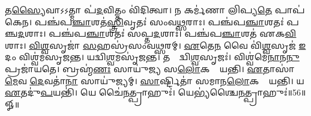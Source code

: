    𑌤\ul{𑌸𑍍𑌯𑍈}𑌵𑌾𑌽𑌽𑌤𑍍𑌮𑌾 𑌪॑\ul{𑌦}𑌵𑌿𑌤𑍍𑌤𑌂 𑌵𑌿॑𑌦𑌿𑌤𑍍𑌵𑌾।
   𑌨 𑌕𑌰𑍍𑌮॑𑌣𑌾 𑌲𑌿𑌪𑍍𑌯\ul{𑌤𑍇} 𑌪𑌾𑌪॑𑌕𑍇𑌨।
   𑌪𑌞𑍍𑌚॑𑌪\ul{𑌞𑍍𑌚𑌾}𑌶𑌤॑\ul{𑌸𑍍𑌤𑍍𑌰𑌿}𑌵𑍃𑌤𑌃॑ 𑌸𑌂𑌵\ul{𑌥𑍍𑌸}𑌰𑌾𑌃।
   𑌪𑌞𑍍𑌚॑𑌪\ul{𑌞𑍍𑌚𑌾}𑌶𑌤𑌃॑ 𑌪𑌞𑍍𑌚\ul{𑌦}𑌶𑌾𑌃।
   𑌪𑌞𑍍𑌚॑𑌪\ul{𑌞𑍍𑌚𑌾}𑌶𑌤𑌃॑ 𑌸𑌪𑍍𑌤\ul{𑌦}𑌶𑌾𑌃।
   𑌪𑌞𑍍𑌚॑𑌪\ul{𑌞𑍍𑌚𑌾}𑌶𑌤॑ 𑌏𑌕\ul{𑌵𑌿}\ul{}𑌶𑌾𑌃।
   \ul{𑌵𑌿}\ul{𑌶𑍍𑌵}𑌸𑍃𑌜𑌾॑ \ul{𑌸}𑌹𑌸𑍍𑌰॑𑌸𑌂𑌵𑌥𑍍𑌸𑌰𑌮𑍍।
   \ul{𑌏}𑌤𑍇\ul{𑌨} 𑌵𑍈 𑌵𑌿॑\ul{𑌶𑍍𑌵}𑌸𑍃𑌜॑ \ul{𑌇}𑌦𑌂 𑌵𑌿𑌶𑍍𑌵॑𑌮𑌸𑍃𑌜𑌨𑍍𑌤।
   𑌯𑌦𑍍𑌵𑌿\ul{𑌶𑍍𑌵}𑌮𑌸𑍃॑𑌜𑌨𑍍𑌤।
   𑌤𑌸𑍍𑌮𑌾᳚𑌦𑍍𑌵𑌿\ul{𑌶𑍍𑌵}𑌸𑍃𑌜𑌃॑।
   𑌵𑌿𑌶𑍍𑌵॑𑌮𑍇\ul{𑌨𑌾}𑌨\ul{𑌨𑍁} 𑌪𑍍𑌰𑌜𑌾॑𑌯𑌤𑍇।
   𑌬𑍍𑌰𑌹𑍍𑌮॑\ul{𑌣𑌃} 𑌸𑌾𑌯𑍁॑𑌜𑍍𑌯 𑌸\ul{𑌲𑍋}𑌕𑌤𑌾𑌂᳚ 𑌯𑌨𑍍𑌤𑌿।
   \ul{𑌏}𑌤𑌾𑌸𑌾॑\ul{𑌮𑍇}𑌵 \ul{𑌦𑍇}𑌵𑌤𑌾॑\ul{𑌨𑌾}\ul{} 𑌸𑌾𑌯𑍁॑𑌜𑍍𑌯𑌮𑍍।
   \ul{𑌸𑌾}𑌰𑍍𑌷𑍍𑌟𑌿𑌤𑌾॑ 𑌸𑌮𑌾𑌨\ul{𑌲𑍋}𑌕𑌤𑌾𑌂᳚ 𑌯𑌨𑍍𑌤𑌿।
   𑌯 \ul{𑌏}𑌤𑌦𑍁॑\ul{𑌪}𑌯𑌨𑍍𑌤𑌿॑।
   𑌯𑍇 𑌚𑍈॑\ul{𑌨}𑌤𑍍𑌪𑍍𑌰𑌾𑌹𑍁𑌃॑।
   𑌯𑍇𑌭𑍍𑌯॑𑌶𑍍𑌚𑍈\ul{𑌨}𑌤𑍍𑌪𑍍𑌰𑌾𑌹𑍁𑌃॑॥56॥
 𑍐॥


\closesection

